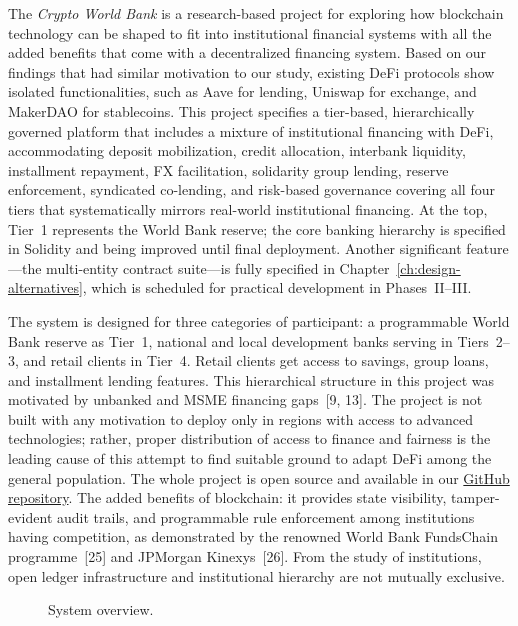 \label{sec:intro}

The \textit{Crypto World Bank} is a research-based project for exploring how blockchain technology can be shaped to fit into institutional financial systems with all the added benefits that come with a decentralized financing system. Based on our findings that had similar motivation to our study, existing DeFi protocols show isolated functionalities, such as Aave for lending, Uniswap for exchange, and MakerDAO for stablecoins. This project specifies a tier-based, hierarchically governed platform that includes a mixture of institutional financing with DeFi, accommodating deposit mobilization, credit allocation, interbank liquidity, installment repayment, FX facilitation, solidarity group lending, reserve enforcement, syndicated co-lending, and risk-based governance covering all four tiers that systematically mirrors real-world institutional financing. At the top, Tier~1 represents the World Bank reserve; the core banking hierarchy is specified in Solidity and being improved until final deployment. Another significant feature---the multi-entity contract suite---is fully specified in Chapter~\ref{ch:design-alternatives}, which is scheduled for practical development in Phases~II--III.

The system is designed for three categories of participant: a programmable World Bank reserve as Tier~1, national and local development banks serving in Tiers~2--3, and retail clients in Tier~4. Retail clients get access to savings, group loans, and installment lending features. This hierarchical structure in this project was motivated by unbanked and MSME financing gaps~[9, 13]. The project is not built with any motivation to deploy only in regions with access to advanced technologies; rather, proper distribution of access to finance and fairness is the leading cause of this attempt to find suitable ground to adapt DeFi among the general population. The whole project is open source and available in our \href{https://github.com/Yuvraajrahman/Cryto-World-Bank}{GitHub repository}. The added benefits of blockchain: it provides state visibility, tamper-evident audit trails, and programmable rule enforcement among institutions having competition, as demonstrated by the renowned World Bank FundsChain programme~[25] and JPMorgan Kinexys~[26]. From the study of institutions, open ledger infrastructure and institutional hierarchy are not mutually exclusive.




\begin{figure}[H]
\centering
{}
\caption[System overview]{System overview.}
\label{fig:intro-system-overview}
\end{figure}

